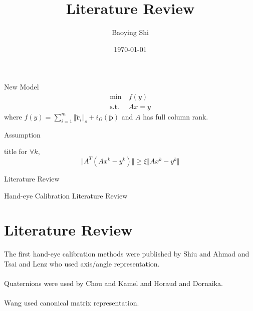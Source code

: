\documentclass[10pt,cjk]{beamer}
\begin{document}
	\newcommand{\mx}[1]{\boldsymbol{#1}}
	\newcommand{\vr}[1]{\vec{\boldsymbol{#1}}}
	\newcommand{\qn}[1]{\boldsymbol{#1}}
	\newcommand{\dqn}[1]{\breve{\boldsymbol{#1}}}
	\newcommand{\m}{~\mathrm{m}}
	\newcommand{\rad}{~\mathrm{rad}}
	\newcommand{\opvec}{\mathrm{vec}}
	\newcommand{\opdqvec}{\mathrm{\breve{v}ec}}
	
	\newtheorem{Thm}{Theorem}[section]
	\newtheorem{Def}[Thm]{Definition}
	\newtheorem{Ass}[Thm]{Assumption}
	\newtheorem{Lem}[Thm]{Lemma}
	\newtheorem{Cor}[Thm]{Corollary}
	\newtheorem{Exm}[Thm]{Example}

	\title{Literature Review}
	\subtitle{}
	\author{Baoying Shi}
	\date{\today}
	\frame{\titlepage}
	
	\begin{frame}
		\tableofcontents  
	\end{frame}
	
	\begin{frame}{New Model}
		\begin{equation}\label{newmodel}
			\begin{aligned}
				\min ~&f\left(y\right)\\
				\mathrm{s.t.}~~ &Ax=y
			\end{aligned}
		\end{equation}
		where $f\left(y\right)=\sum\limits_{i=1}^{m}\Vert \dqn{r}_{i}\Vert_{s}+i_{\Omega}\left(\dqn{p}\right)$ and $A$ has full column rank.
	\end{frame}
	
	\begin{frame}{Assumption}
		\begin{block}{title}
			for $\forall k$,
			\begin{equation}\label{ass}
				\Vert A^{T}\left(Ax^{k}-y^{k}\right)\Vert\ge\xi\Vert Ax^{k}-y^{k}\Vert
			\end{equation}
		\end{block}
		
	\end{frame}
	\begin{frame}{Literature Review}
		\printbibliography
	\end{frame}
	\begin{frame}{Hand-eye Calibration Literature Review}
		\section{Literature Review}
		The first hand-eye calibration methods were published by
		Shiu and Ahmad and Tsai and Lenz who used  axis/angle representation.
		\\ \hspace*{\fill} \\ 
		Quaternions were used by
		Chou and Kamel and Horaud and Dornaika\footfullcite{horaud1995hand}.
		\\ \hspace*{\fill} \\ 
		Wang used  canonical
		matrix representation. 
	\end{frame}
	
\end{document}
